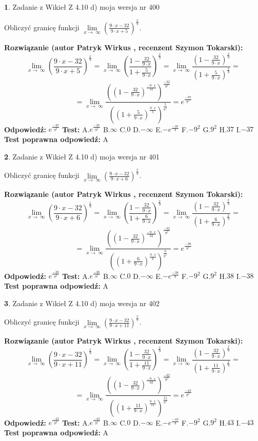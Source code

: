 \documentclass[12pt, a4paper]{article}
\theoremstyle{definition} %
\newtheorem{zad}{}
\newcommand{\zadStart}[1]{\begin{zad}#1\newline}
\newcommand{\zadStop}{\end{zad}}
\newcommand{\rozwStart}[2]{\noindent \textbf{Rozwiązanie (autor #1 , recenzent #2): }\newline}
\newcommand{\rozwStop}{\newline}
\newcommand{\odpStart}{\noindent \textbf{Odpowiedź:}\newline}
\newcommand{\odpStop}{\newline}
\newcommand{\testStart}{\noindent \textbf{Test:}\newline}
\newcommand{\testStop}{\newline}
\newcommand{\kluczStart}{\noindent \textbf{Test poprawna odpowiedź:}\newline}
\newcommand{\kluczStop}{\newline}
\begin{document}
\zadStart{Zadanie z Wikieł Z 4.10 d) moja wersja nr 400}


Obliczyć granicę funkcji  $\lim\limits_{x\to\ \infty}(\frac{9\cdot x-32}{9\cdot x+5})^{\frac{x}{9}}$.
\zadStop
\rozwStart{Patryk Wirkus}{Szymon Tokarski}
$$\lim\limits_{x\to\ \infty}(\frac{9\cdot x-32}{9\cdot x+5})^{\frac{x}{9}} = \lim\limits_{x\to\ \infty}(\frac{1-\frac{32}{9\cdot x}}{1+\frac{5}{9\cdot x}})^{\frac{x}{9}}=\lim\limits_{x\to\ \infty}\frac{(1-\frac{32}{9\cdot x})^{\frac{x}{9}}}{(1+\frac{5}{9\cdot x})^{\frac{x}{9}}}=$$
$$=\lim\limits_{x\to\ \infty}\frac{((1-\frac{32}{9\cdot x})^{\frac{-9\cdot x}{32}})^{\frac{-32}{9^{2}}}}{((1+\frac{5}{9\cdot x})^{\frac{9\cdot x}{5}})^{\frac{5}{9^{2}}}}=e^{\frac{-37}{9^{2}}}$$
\rozwStop
\odpStart
$e^{\frac{-37}{9^{2}}}$
\odpStop
\testStart
A.$e^{\frac{-37}{9^{2}}}$ B.$\infty$ C.$0$ D.$-\infty$ E.$-e^{\frac{-37}{9}}$
F.$-9^{2}$ G.$9^{2}$
H.$37$
I.$-37$
\testStop
\kluczStart
A
\kluczStop



\zadStart{Zadanie z Wikieł Z 4.10 d) moja wersja nr 401}


Obliczyć granicę funkcji  $\lim\limits_{x\to\ \infty}(\frac{9\cdot x-32}{9\cdot x+6})^{\frac{x}{9}}$.
\zadStop
\rozwStart{Patryk Wirkus}{Szymon Tokarski}
$$\lim\limits_{x\to\ \infty}(\frac{9\cdot x-32}{9\cdot x+6})^{\frac{x}{9}} = \lim\limits_{x\to\ \infty}(\frac{1-\frac{32}{9\cdot x}}{1+\frac{6}{9\cdot x}})^{\frac{x}{9}}=\lim\limits_{x\to\ \infty}\frac{(1-\frac{32}{9\cdot x})^{\frac{x}{9}}}{(1+\frac{6}{9\cdot x})^{\frac{x}{9}}}=$$
$$=\lim\limits_{x\to\ \infty}\frac{((1-\frac{32}{9\cdot x})^{\frac{-9\cdot x}{32}})^{\frac{-32}{9^{2}}}}{((1+\frac{6}{9\cdot x})^{\frac{9\cdot x}{6}})^{\frac{6}{9^{2}}}}=e^{\frac{-38}{9^{2}}}$$
\rozwStop
\odpStart
$e^{\frac{-38}{9^{2}}}$
\odpStop
\testStart
A.$e^{\frac{-38}{9^{2}}}$ B.$\infty$ C.$0$ D.$-\infty$ E.$-e^{\frac{-38}{9}}$
F.$-9^{2}$ G.$9^{2}$
H.$38$
I.$-38$
\testStop
\kluczStart
A
\kluczStop



\zadStart{Zadanie z Wikieł Z 4.10 d) moja wersja nr 402}


Obliczyć granicę funkcji  $\lim\limits_{x\to\ \infty}(\frac{9\cdot x-32}{9\cdot x+11})^{\frac{x}{9}}$.
\zadStop
\rozwStart{Patryk Wirkus}{Szymon Tokarski}
$$\lim\limits_{x\to\ \infty}(\frac{9\cdot x-32}{9\cdot x+11})^{\frac{x}{9}} = \lim\limits_{x\to\ \infty}(\frac{1-\frac{32}{9\cdot x}}{1+\frac{11}{9\cdot x}})^{\frac{x}{9}}=\lim\limits_{x\to\ \infty}\frac{(1-\frac{32}{9\cdot x})^{\frac{x}{9}}}{(1+\frac{11}{9\cdot x})^{\frac{x}{9}}}=$$
$$=\lim\limits_{x\to\ \infty}\frac{((1-\frac{32}{9\cdot x})^{\frac{-9\cdot x}{32}})^{\frac{-32}{9^{2}}}}{((1+\frac{11}{9\cdot x})^{\frac{9\cdot x}{11}})^{\frac{11}{9^{2}}}}=e^{\frac{-43}{9^{2}}}$$
\rozwStop
\odpStart
$e^{\frac{-43}{9^{2}}}$
\odpStop
\testStart
A.$e^{\frac{-43}{9^{2}}}$ B.$\infty$ C.$0$ D.$-\infty$ E.$-e^{\frac{-43}{9}}$
F.$-9^{2}$ G.$9^{2}$
H.$43$
I.$-43$
\testStop
\kluczStart
A
\kluczStop
\end{document}
